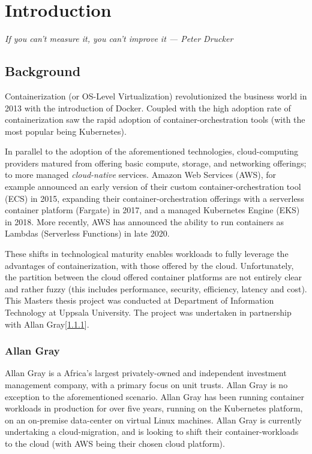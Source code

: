 \chapter{Introduction}
\label{sec:intro}
\textit{If you can't measure it, you can't improve it --- Peter Drucker}

\section{Background}
Containerization (or OS-Level Virtualization) revolutionized the business world in 2013\cite{virtualization} with the introduction of Docker\cite{docker_usage}.
Coupled with the high adoption rate of containerization saw the rapid adoption of container-orchestration tools (with the most popular being Kubernetes\cite{k8s}).

In parallel to the adoption of the aforementioned technologies, cloud-computing providers matured from offering basic compute, storage,
and networking offerings\cite{barr_2009}; to more managed \textit{cloud-native} services. Amazon Web Services (AWS),
for example announced an early version of their custom container-orchestration tool (ECS) in 2015\cite{ecs},
expanding their container-orchestration offerings with a serverless container platform (Fargate) in 2017\cite{fargate},
and a managed Kubernetes Engine (EKS) in 2018\cite{eks}.
More recently, AWS has announced the ability to run containers as Lambdas (Serverless Functions) in late 2020\cite{lambda}.

\noindent These shifts in technological maturity enables workloads to fully leverage the advantages of containerization, with those offered by the cloud.
Unfortunately, the partition between the cloud offered container platforms are not entirely clear and rather fuzzy
(this includes performance, security, efficiency, latency and cost).\\

\noindent This Masters thesis project was conducted at Department of Information Technology at Uppsala University.
The project was undertaken in partnership with Allan Gray[\ref{sec:allan_gray}].

\subsection{Allan Gray}
\label{sec:allan_gray}
Allan Gray\cite{allan_gray} is a Africa's largest privately-owned and independent investment management company, with a primary focus on unit trusts.
Allan Gray is no exception to the aforementioned scenario. Allan Gray has been running container workloads in production for over five years,
running on the Kubernetes platform, on an on-premise data-center on virtual Linux machines.
Allan Gray is currently undertaking a cloud-migration, and is looking to shift their container-workloads to the cloud (with AWS being their chosen cloud platform).

